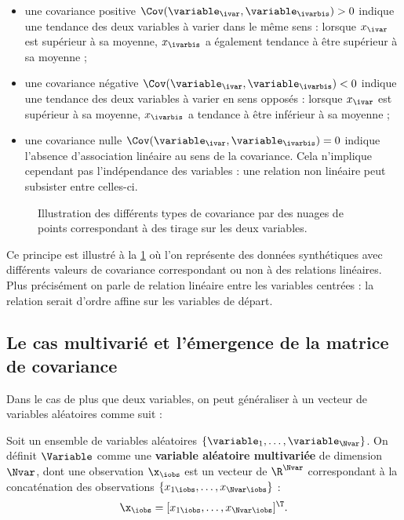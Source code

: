 \begin{itemize}
  \item une covariance positive
  $\Cov(\variable_{\ivar},\variable_{\ivarbis})>0$
  indique une tendance des deux variables à varier dans le même sens :
  lorsque $x_{\ivar}$ est supérieur à sa moyenne, $x_{\ivarbis}$
  a également tendance à être supérieur à sa moyenne ;

  \item une covariance négative
  $\Cov(\variable_{\ivar},\variable_{\ivarbis})<0$
  indique une tendance des deux variables à varier en sens opposés :
  lorsque $x_{\ivar}$ est supérieur à sa moyenne, $x_{\ivarbis}$
  a tendance à être inférieur à sa moyenne ;

  \item une covariance nulle
  $\Cov(\variable_{\ivar},\variable_{\ivarbis})=0$
  indique l'absence d'association linéaire au sens de la covariance.
  Cela n'implique cependant pas l'indépendance des variables :
  une relation non linéaire peut subsister entre celles-ci.
\end{itemize}



\begin{figure}[h]
  \centering
  
  \caption{Illustration des différents types de covariance par des nuages de points correspondant à des tirage sur les deux variables.}
  \label{fig:covariance-types}
\end{figure}



Ce principe est illustré à la \cref{fig:covariance-types} où l'on représente des données synthétiques avec différents valeurs de covariance correspondant ou non à des relations linéaires. Plus précisément on parle de relation linéaire entre les variables centrées : la relation serait d'ordre affine sur les variables de départ.


%
\subsection{Le cas multivarié et l'émergence de la matrice de covariance}
\label{subsec:context-definition-multivariate}

Dans le cas de plus que deux variables, on peut généraliser à un vecteur de variables aléatoires comme suit :

\begin{definition}
\label{def:context-definition-vecteuraleatoire}
  Soit un ensemble de variables aléatoires
  $\{\variable_1,\dots,\variable_\Nvar\}$.
  On définit $\Variable$ comme une \textbf{variable aléatoire
  multivariée} de dimension $\Nvar$, dont une observation
  $\x_\iobs$ est un vecteur de $\R^\Nvar$ correspondant à la
  concaténation des observations
  $\{x_{1\iobs},\dots,x_{\Nvar\iobs}\}$ :
\begin{equation}
  \x_{\iobs}
  =
  [x_{1\iobs},\dots,x_{\Nvar\iobs}]^\T.
  \label{eq:context-definition-observation-vector}
\end{equation}

\end{definition}

